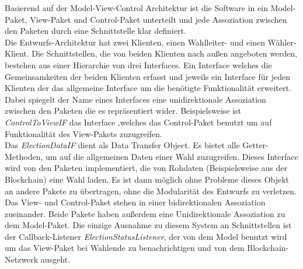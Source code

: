 \documentclass[parskip=full]{scrartcl}
\newcommand{\textitx}[1]{\mbox{\textit{#1}}}
\begin{document}
	Basierend auf der Model-View-Control Architektur ist die Software in ein Model-Paket, View-Paket und Control-Paket unterteilt und jede Assoziation zwischen den Paketen durch eine Schnittstelle klar definiert. 
	\\
	Die Entwurfs-Architektur hat zwei Klienten, einen Wahlleiter- und einen Wähler-Klient. Die Schnittstellen, die von beiden Klienten nach außen angeboten werden, bestehen aus einer Hierarchie von drei Interfaces. Ein Interface welches die Gemeinsamkeiten der beiden Klienten erfasst und jeweils ein Interface für jeden Klienten der das allgemeine Interface um die benötigte Funktionalität erweitert. Dabei spiegelt der Name eines Interfaces eine unidirektionale Assoziation zwischen den Paketen die es repräsentiert wider. Beispielsweise ist \textitx{ControlToViewIF} das Interface ,welches das Control-Paket benutzt um auf Funktionalität des View-Pakets zuzugreifen.
	\\
	Das \textitx{ElectionDataIF} dient als Data Transfer Object. Es bietet alle Getter-Methoden, um auf die allgemeinen Daten einer Wahl zuzugreifen. Dieses Interface wird von den Paketen implementiert, die von Rohdaten (Beispielsweise aus der Blockchain) eine Wahl laden. Es ist dann möglich ohne Probleme dieses Objekt an andere Pakete zu übertragen, ohne die Modularität des Entwurfs zu verletzen.
	\\
	Das View- und Control-Paket stehen in einer bidirektionalen Assoziation zueinander. Beide Pakete haben außerdem eine Unidirektionale Assoziation zu dem Model-Paket. Die einzige Ausnahme zu diesem System an Schnittstellen ist der Callback-Listener \textit{ElectionStatusListener}, der von dem Model benutzt wird um das View-Paket bei Wahlende zu benachrichtigen und von dem Blockchain-Netzwerk ausgeht.
	\\
\end{document}
